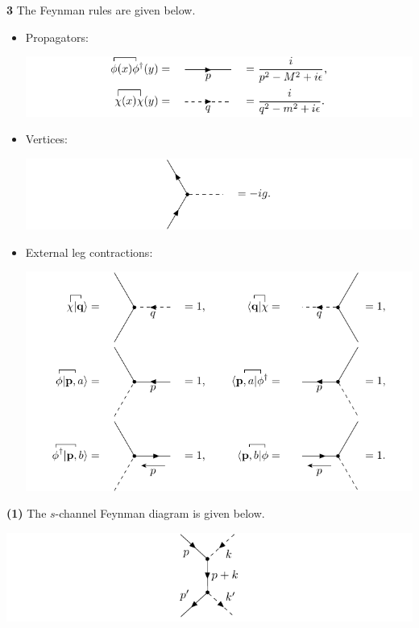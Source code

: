 \documentclass{article}
\makeatletter
\newcommand*{\shifttext}[1]{%
  \settowidth{\@tempdima}{#1}%
  \hspace{-\@tempdima}#1%
}
\newcommand{\plabel}[1]{%
\shifttext{\textbf{#1}\quad}%
}
\makeatother
\begin{document}
\clearpage
\plabel{3}%
The Feynman rules are given below.
\begin{itemize}
    \item Propagators:
    \begin{center}
        \includegraphics{img/propagator/propagator.pdf}
    \end{center}
    \item Vertices:
    \begin{center}
        \includegraphics{img/vertex/vertex.pdf}
    \end{center}
    \item External leg contractions:
    \begin{center}
        \includegraphics{img/leg/leg.pdf}
    \end{center}
\end{itemize}
\plabel{(1)}%
The $s$-channel Feynman diagram is given below.
\begin{center}
    \includegraphics{img/compton/compton-s.pdf}
\end{center}
\end{document}
